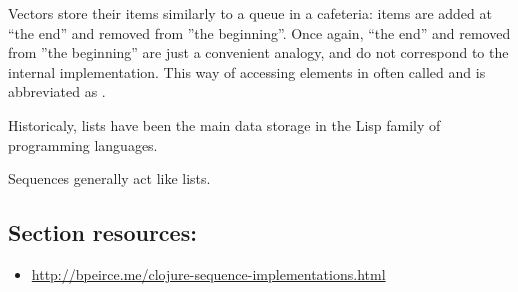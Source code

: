 Vectors store their items similarly to a queue in a cafeteria: items are added at ``the end'' and removed from ''the beginning''. Once again, ``the end'' and removed from ''the beginning'' are just a convenient analogy, and do not correspond to the internal implementation. This way of accessing elements in often called  and is abbreviated as . 

Historicaly, lists have been the main data storage in the Lisp family of programming languages. 



Sequences generally act like lists. 


\subsection{Section resources:}
\begin{itemize}
\item \url{http://bpeirce.me/clojure-sequence-implementations.html}
\end{itemize}

